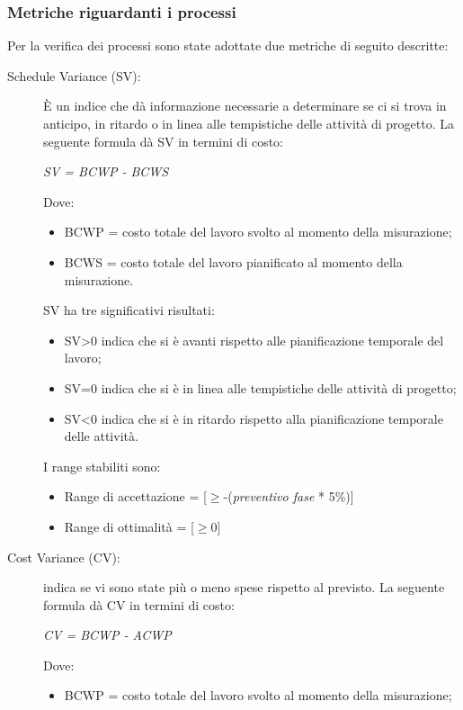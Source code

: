     \subsubsection{Metriche riguardanti i processi}
    Per la verifica dei processi sono state adottate due metriche di seguito descritte:
    \begin{description}
      \item[Schedule Variance (SV):] È un indice che dà informazione necessarie a determinare se ci si trova in anticipo,
      in ritardo o in linea alle tempistiche delle attività di progetto.
      La seguente formula dà SV in termini di costo:
      \begin{center}
        \emph{SV = BCWP - BCWS}
      \end{center}
      Dove:
      \begin{itemize}
        \item BCWP = costo totale del lavoro svolto al momento della misurazione;
        \item BCWS = costo totale del lavoro pianificato al momento della misurazione.
      \end{itemize}
      SV ha tre significativi risultati:
      \begin{itemize}
        \item SV>0 indica che si è avanti rispetto alle pianificazione temporale del lavoro;
        \item SV=0 indica che si è in linea alle tempistiche delle attività di progetto;
        \item SV<0 indica che si è in ritardo rispetto alla pianificazione temporale delle attività.
      \end{itemize}
      I range stabiliti sono:
      \begin{itemize}
        \item Range di accettazione = [\(\geq\)-(\emph{preventivo fase} * 5\%)]
        \item Range di ottimalità = [\(\geq\)0]
      \end{itemize}
      \item[Cost Variance (CV):] indica se vi sono state più o meno spese rispetto al previsto.
      La seguente formula dà CV in termini di costo:
      \begin{center}
        \emph{CV = BCWP - ACWP}
      \end{center}
      Dove:
      \begin{itemize}
        \item BCWP = costo totale del lavoro svolto al momento della misurazione;

\end{itemize}
\end{description}
